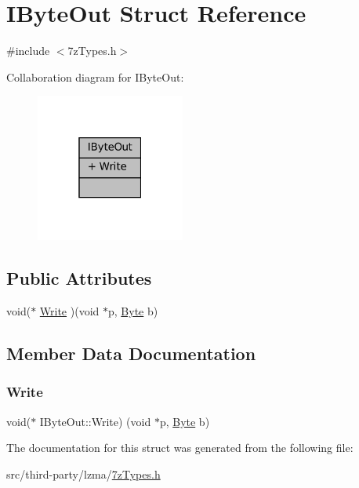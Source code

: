 \hypertarget{struct_i_byte_out}{}\section{I\+Byte\+Out Struct Reference}
\label{struct_i_byte_out}


{\ttfamily \#include $<$7z\+Types.\+h$>$}



Collaboration diagram for I\+Byte\+Out\+:
\nopagebreak
\begin{figure}[H]
\begin{center}
\leavevmode
\includegraphics[width=139pt]{struct_i_byte_out__coll__graph}
\end{center}
\end{figure}
\subsection*{Public Attributes}
\begin{DoxyCompactItemize}
\item 
void($\ast$ \mbox{\hyperlink{struct_i_byte_out_a44cea4415f6c187ecc94dcaa7e21fd7e}{Write}} )(void $\ast$p, \mbox{\hyperlink{7z_types_8h_ae3a497195d617519e5353ea7b417940f}{Byte}} b)
\end{DoxyCompactItemize}


\subsection{Member Data Documentation}
\mbox{\label{struct_i_byte_out_a44cea4415f6c187ecc94dcaa7e21fd7e}} 
\subsubsection{\texorpdfstring{Write}{Write}}
{\footnotesize\ttfamily void($\ast$ I\+Byte\+Out\+::\+Write) (void $\ast$p, \mbox{\hyperlink{7z_types_8h_ae3a497195d617519e5353ea7b417940f}{Byte}} b)}



The documentation for this struct was generated from the following file\+:\begin{DoxyCompactItemize}
\item 
src/third-\/party/lzma/\mbox{\hyperlink{7z_types_8h}{7z\+Types.\+h}}\end{DoxyCompactItemize}
